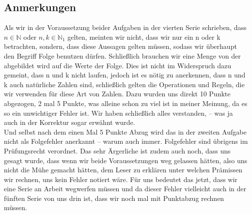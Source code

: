 \documentclass[12pt, a4paper]{article}
\begin{document}
\subsection*{Anmerkungen}
\begin{singlespace}
    Als wir in der Voraussetzung beider Aufgaben in der vierten Serie schrieben, dass \(n \in \mathbb N\) oder \(n,k \in \mathbb N_1\) gelten, meinten wir nicht, dass wir nur ein n oder k betrachten, sondern, dass diese Aussagen gelten müssen, sodass wir überhaupt den Begriff Folge benutzen dürfen. Schließlich brauchen wir eine Menge von der abgebildet wird auf die Werte der Folge. Dies ist nicht im Widerspruch dazu gemeint, dass n und k nicht laufen, jedoch ist es nötig zu anerkennen, dass n und k auch natürliche Zahlen sind, schließlich gelten die Operationen und Regeln, die wir verwenden für diese Art von Zahlen. Dazu wurden uns direkt 10 Punkte abgezogen, 2 mal 5 Punkte, was alleine schon zu viel ist in meiner Meinung, da es so ein unwichtiger Fehler ist. Wir haben schließlich alles verstanden, -- was ja auch in der Korrektur sogar erwähnt wurde.\\
    Und selbst nach dem einen Mal 5 Punkte Abzug wird das in der zweiten Aufgabe nicht als Folgefehler anerkannt -- warum auch immer. Folgefehler sind übrigens im Prüfungsrecht verordnet. Das sehr Ärgerliche ist zudem auch noch, dass uns gesagt wurde, dass wenn wir beide Voraussetzungen weg gelassen hätten, also uns nicht die Mühe gemacht hätten, dem Leser zu erklären unter welchen Prämissen wir rechnen, uns kein Fehler notiert wäre. Für uns bedeutet das jetzt, dass wir eine Serie an Arbeit wegwerfen müssen und da dieser Fehler vielleicht auch in der fünften Serie von uns drin ist, dass wir noch mal mit Punktabzug rechnen müssen.    
\end{singlespace}
\end{document}
